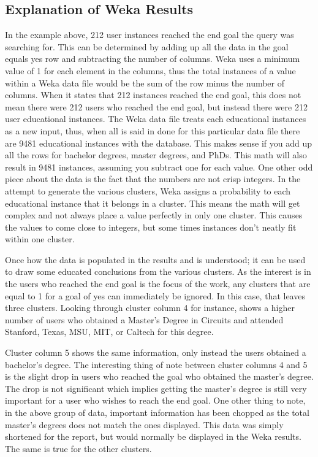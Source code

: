 \subsection{Explanation of Weka Results}
In the example above, 212 user instances reached the end goal the query was
searching for.  This can be determined by adding up all the data in the goal
equals yes row and subtracting the number of columns.  Weka uses a minimum value
of 1 for each element in the columns, thus the total instances of a value within
a Weka data file would be the sum of the row minus the number of columns.  When
it states that 212 instances reached the end goal, this does not mean there were
212 users who reached the end goal, but instead there were 212 user educational instances.
The Weka data file treats each educational instances as a new input, thus, when
all is said in done for this particular data file there are 9481 educational
instances with the database.  This makes sense if you add up all the rows for
bachelor degrees, master degrees, and PhDs.  This math will also result in 9481
instances, assuming you subtract one for each value.  One other odd piece about
the data is the fact that the numbers are not crisp integers.  In the attempt to
generate the various clusters, Weka assigns a probability to each educational
instance that it belongs in a cluster.  This means the math will get complex and
not always place a value perfectly in only one cluster.  This causes the values
to come close to integers, but some times instances don't neatly fit within one cluster.

Once how the data is populated in the results and is understood; it can be used
to draw some educated conclusions from the various clusters.  As the interest
is in the users who reached the end goal is the focus of the work, any clusters
that are equal to 1 for a goal of yes can immediately be ignored.  In this case,
that leaves three clusters.  Looking through cluster column 4 for instance,
shows a higher number of users who obtained a Master's Degree in Circuits and
attended Stanford, Texas, MSU, MIT, or Caltech for this degree.  

Cluster column 5 shows the same information, only instead the users obtained a
bachelor's degree.  The interesting thing of note between cluster columns 4 and
5 is the slight drop in users who reached the goal who obtained the master's degree. 
The drop is not significant which implies getting the master's degree is still
very important for a user who wishes to reach the end goal.  One other thing to note,
in the above group of data, important information has been chopped as the total
master's degrees does not match the ones displayed.  This data was simply
shortened for the report, but would normally be displayed in the Weka results. 
The same is true for the other clusters.  

